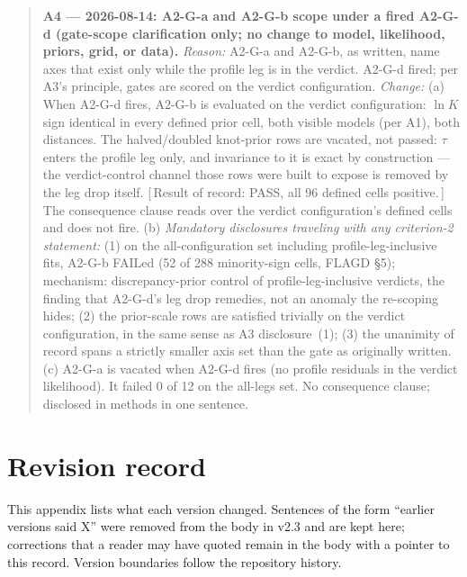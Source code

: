 \documentclass[11pt]{article}
\begin{document}
\begin{quote}\small
\textbf{A4 --- 2026-08-14: A2-G-a and A2-G-b scope under a fired A2-G-d (gate-scope clarification
only; no change to model, likelihood, priors, grid, or data).}
\emph{Reason:} A2-G-a and A2-G-b, as written, name axes that exist only while the profile leg is in
the verdict. A2-G-d fired; per A3's principle, gates are scored on the verdict configuration.
\emph{Change:} (a) When A2-G-d fires, A2-G-b is evaluated on the verdict configuration: $\ln K$
sign identical in every defined prior cell, both visible models (per A1), both distances. The
halved/doubled knot-prior rows are vacated, not passed: $\tau$ enters the profile leg only, and
invariance to it is exact by construction --- the verdict-control channel those rows were built to
expose is removed by the leg drop itself. [\,Result of record: PASS, all 96 defined cells positive.\,]
The consequence clause reads over the verdict configuration's defined cells and does not fire.
(b) \emph{Mandatory disclosures traveling with any criterion-2 statement:} (1) on the
all-configuration set including profile-leg-inclusive fits, A2-G-b FAILed (52 of 288 minority-sign
cells, FLAGD \S5); mechanism: discrepancy-prior control of profile-leg-inclusive verdicts, the
finding that A2-G-d's leg drop remedies, not an anomaly the re-scoping hides; (2) the prior-scale
rows are satisfied trivially on the verdict configuration, in the same sense as A3 disclosure~(1);
(3) the unanimity of record spans a strictly smaller axis set than the gate as originally written.
(c) A2-G-a is vacated when A2-G-d fires (no profile residuals in the verdict likelihood). It failed
0 of 12 on the all-legs set. No consequence clause; disclosed in methods in one sentence.
\end{quote}

\section{Revision record}
\label{app:rev}

This appendix lists what each version changed. Sentences of the form ``earlier versions said X'' were removed from the body in v2.3 and are kept here; corrections that a reader may have quoted remain in the body with a pointer to this record. Version boundaries follow the repository history.
\end{document}
